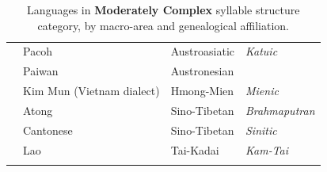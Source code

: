 \begin{table}
\begin{tabularx}{\textwidth}{lQQQ}
& {Pacoh} & Austroasiatic & \textit{Katuic}\\
& {Paiwan} & Austronesian & \\
& Kim Mun (Vietnam dialect) & Hmong-Mien & \textit{Mienic}\\
& {Atong} & Sino-Tibetan & \textit{Brahmaputran}\\
& {Cantonese} & Sino-Tibetan & \textit{Sinitic}\\
& {Lao} & Tai-Kadai & \textit{Kam-Tai}\\
\lspbottomrule
\end{tabularx}
\caption{\label{tab:2.5.}Languages in \textbf{Moderately Complex} syllable structure category, by macro-area and genealogical affiliation.}
\end{table}




